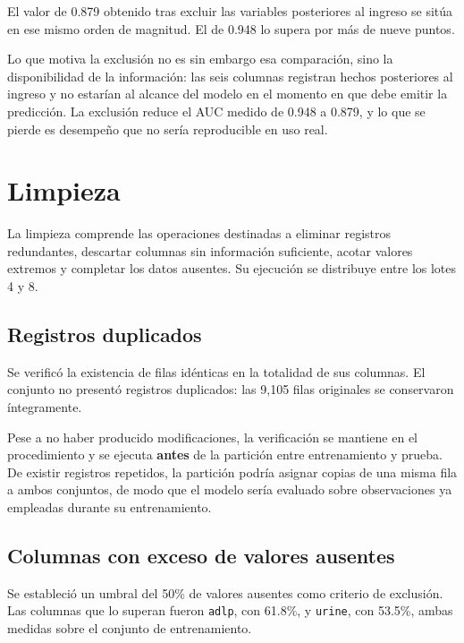 \documentclass[11pt]{article}
\begin{document}
El valor de 0.879 obtenido tras excluir las variables posteriores al ingreso se sitúa en ese mismo
orden de magnitud. El de 0.948 lo supera por más de nueve puntos.

Lo que motiva la exclusión no es sin embargo esa comparación, sino la disponibilidad de la
información: las seis columnas registran hechos posteriores al ingreso y no estarían al alcance
del modelo en el momento en que debe emitir la predicción. La exclusión reduce el AUC medido de
0.948 a 0.879, y lo que se pierde es desempeño que no sería reproducible en uso real.

\section{Limpieza}
\label{sec:limpieza}

La limpieza comprende las operaciones destinadas a eliminar registros redundantes, descartar
columnas sin información suficiente, acotar valores extremos y completar los datos ausentes. Su
ejecución se distribuye entre los lotes 4 y 8.

\subsection{Registros duplicados}

Se verificó la existencia de filas idénticas en la totalidad de sus columnas. El conjunto no
presentó registros duplicados: las 9{,}105 filas originales se conservaron íntegramente.

Pese a no haber producido modificaciones, la verificación se mantiene en el procedimiento y se
ejecuta \textbf{antes} de la partición entre entrenamiento y prueba. De existir registros
repetidos, la partición podría asignar copias de una misma fila a ambos conjuntos, de modo que el
modelo sería evaluado sobre observaciones ya empleadas durante su entrenamiento.

\subsection{Columnas con exceso de valores ausentes}

Se estableció un umbral del 50\% de valores ausentes como criterio de exclusión. Las columnas que
lo superan fueron \texttt{adlp}, con 61.8\%, y \texttt{urine}, con 53.5\%, ambas medidas sobre el
conjunto de entrenamiento.
\end{document}
